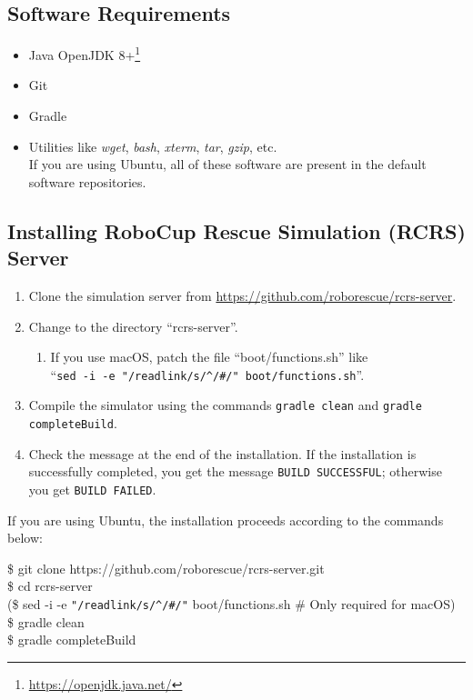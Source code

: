 \documentclass{article}
\begin{document}
\subsection{Software Requirements}
\begin{itemize}
  \item Java OpenJDK 8+\footnote{\url{https://openjdk.java.net/}}
  \item Git
  \item Gradle
  \item Utilities like \emph{wget}, \emph{bash}, \emph{xterm}, \emph{tar}, \emph{gzip}, etc.\\
        If you are using Ubuntu, all of these software are present in the
        default software repositories.
\end{itemize}
\subsection{Installing RoboCup Rescue Simulation (RCRS) Server}
\begin{enumerate}
 \item Clone the simulation server from
       \url{https://github.com/roborescue/rcrs-server}.
 \item Change to the directory ``rcrs-server''.
       \begin{enumerate}
	\item If you use macOS, patch the file ``boot/functions.sh''
	      like\\

	      ``\verb|sed -i -e "/readlink/s/^/#/" boot/functions.sh|''.
       \end{enumerate}
 \item Compile the simulator using the commands \texttt{gradle clean}
       and \texttt{gradle completeBuild}.
 \item Check the message at the end of the installation.
       If the installation is successfully completed, you get the message \texttt{BUILD SUCCESSFUL}; otherwise you get \texttt{BUILD FAILED}.
\end{enumerate}

If you are using Ubuntu, the installation proceeds according to the commands below:

\begin{center}
  \begin{tcolorbox}[title=Installation on Ubuntu, width=.98\linewidth]
  {\ttfamily\small
  \$ git clone https://github.com/roborescue/rcrs-server.git\\
   \$ cd rcrs-server\\
   (\$ sed -i -e \verb|"/readlink/s/^/#/"| boot/functions.sh \# Only required for macOS)\\
  \$ gradle clean\\
  \$ gradle completeBuild
  }
  \end{tcolorbox}
\end{center}
\end{document}
